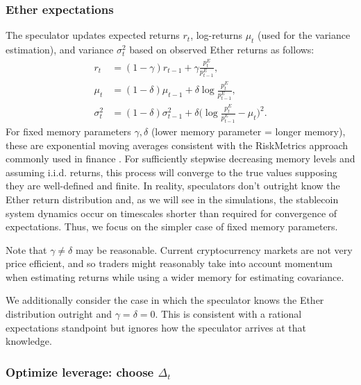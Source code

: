 \subsubsection{Ether expectations} The speculator updates expected returns $r_t$, log-returns $\mu_t$ (used for the variance estimation), and variance $\sigma_t^2$ based on observed Ether returns as follows:
\begin{equation}
\begin{aligned}
r_t &= (1-\gamma) r_{t-1} + \gamma \frac{p^E_t}{p^E_{t-1}}, \\
\mu_t &= (1-\delta)\mu_{t-1} + \delta \log \frac{p_t^E}{p^E_{t-1}}, \\
\sigma_t^2 &= (1-\delta) \sigma_{t-1}^2 + \delta \Big( \log \frac{p^E_t}{p^E_{t-1}} - \mu_t\Big)^2.
\end{aligned}
\end{equation}\label{eq:expectations}
For fixed memory parameters $\gamma,\delta$ (lower memory parameter = longer memory), these are exponential moving averages consistent with the RiskMetrics approach commonly used in finance \cite{longerstaey1996}. For sufficiently stepwise decreasing memory levels and assuming i.i.d. returns, this process will converge to the true values supposing they are well-defined and finite. In reality, speculators don't outright know the Ether return distribution and, as we will see in the simulations, the stablecoin system dynamics occur on timescales shorter than required for convergence of expectations. Thus, we focus on the simpler case of fixed memory parameters.

Note that $\gamma \neq \delta$ may be reasonable. Current cryptocurrency markets are not very price efficient, and so traders might reasonably take into account momentum when estimating returns while using a wider memory for estimating covariance.

We additionally consider the case in which the speculator knows the Ether distribution outright and $\gamma=\delta=0$. This is consistent with a rational expectations standpoint but ignores how the speculator arrives at that knowledge.


\subsubsection{Optimize leverage: choose $\Delta_t$}


